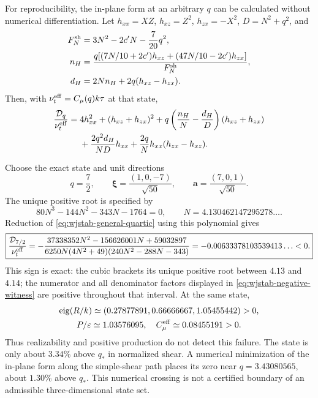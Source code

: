 \documentclass[11pt,a4paper]{article}
\numberwithin{equation}{section}
\begin{document}
For reproducibility, the in-plane form at an arbitrary $q$ can be
calculated without numerical differentiation. Let
$h_{xx}=XZ$, $h_{xz}=Z^2$, $h_{zx}=-X^2$,
$D=N^2+q^2$, and
\begin{align}
 F_N^{\rm sh}&=3N^2-2c'N-\frac7{20}q^2,\nonumber\\
 n_H&=\frac{q[(7N/10+2c')h_{xz}
                  +(47N/10-2c')h_{zx}]}{F_N^{\rm sh}},\nonumber\\
 d_H&=2Nn_H+2q(h_{xz}-h_{zx}).
 \label{eq:wjstab-general-shear-derivatives}
\end{align}
Then, with $\nu_t^{\rm eff}=C_\mu(q)k\tau$ at that state,
\begin{align}
 \frac{\mathcal D_q}{\nu_t^{\rm eff}}
 ={}&4h_{xx}^2+(h_{xz}+h_{zx})^2
 +q\left(\frac{n_H}{N}-\frac{d_H}{D}\right)(h_{xz}+h_{zx})\nonumber\\
 &+\frac{2q^2d_H}{ND}h_{xx}
 +\frac{2q}{N}h_{xx}(h_{zx}-h_{xz}).
 \label{eq:wjstab-general-quartic}
\end{align}

Choose the exact state and unit directions
\begin{equation}
 q=\frac72,\qquad
 \boldsymbol\xi=\frac{(1,0,-7)}{\sqrt{50}},\qquad
 \boldsymbol a=\frac{(7,0,1)}{\sqrt{50}}.
 \label{eq:wjstab-counterexample-state}
\end{equation}
The unique positive root is specified by
\begin{equation}
 80N^3-144N^2-343N-1764=0,
 \qquad N=4.130462147295278\ldots.
 \label{eq:wjstab-counterexample-root}
\end{equation}
Reduction of \eqref{eq:wjstab-general-quartic} using this polynomial
gives
\begin{equation}
 \boxed{\frac{\mathcal D_{7/2}}{\nu_t^{\rm eff}}
 =-\frac{37338352N^2-156626001N+59032897}
 {6250N(4N^2+49)(240N^2-288N-343)}
 =-0.00633378103539413\ldots<0.}
 \label{eq:wjstab-negative-witness}
\end{equation}
This sign is exact: the cubic brackets its unique positive root between
$4.13$ and $4.14$; the numerator and all denominator factors displayed
in \eqref{eq:wjstab-negative-witness} are positive throughout that
interval. At the same state,
\begin{equation}
 \begin{gathered}
 \operatorname{eig}(R/k)\simeq
 (0.27877891,0.66666667,1.05455442)>0,\\
 P/\varepsilon\simeq1.03576095,
 \quad C_\mu^{\rm eff}\simeq0.08455191>0.
 \end{gathered}
 \label{eq:wjstab-counterexample-admissibility}
\end{equation}
Thus realizability and positive production do not detect this failure.
The state is only about $3.34\%$ above $q_*$ in normalized shear. A
numerical minimization of the in-plane form along the simple-shear path
places its zero near $q=3.43080565$, about $1.30\%$ above $q_*$. This
numerical crossing is not a certified boundary of an admissible
three-dimensional state set.
\end{document}
